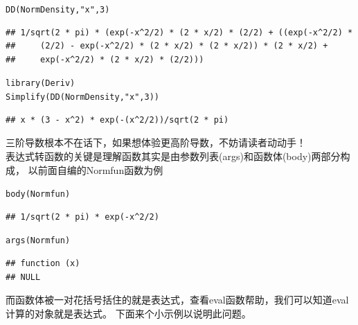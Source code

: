 \documentclass[a4paper]{ctexart}\usepackage[]{graphicx}\usepackage[]{color}
\makeatletter
\newcommand{\hlnum}[1]{\textcolor[rgb]{0.502,0.086,1}{#1}}%
\newcommand{\hlstr}[1]{\textcolor[rgb]{1,0.4,0.2}{#1}}%
\newcommand{\hlstd}[1]{\textcolor[rgb]{0.251,0.251,0.251}{#1}}%
\newcommand{\hlkwd}[1]{\textcolor[rgb]{0.69,0.188,0.941}{#1}}%
\newenvironment{kframe}{%
 \def\at@end@of@kframe{}%
 \ifinner\ifhmode%
  \def\at@end@of@kframe{\end{minipage}}%
  \begin{minipage}{\columnwidth}%
 \fi\fi%
 \def\FrameCommand##1{\hskip\@totalleftmargin \hskip-\fboxsep
 \colorbox{shadecolor}{##1}\hskip-\fboxsep
     \hskip-\linewidth \hskip-\@totalleftmargin \hskip\columnwidth}%
 \MakeFramed {\advance\hsize-\width
   \@totalleftmargin\z@ \linewidth\hsize
   \@setminipage}}%
 {\par\unskip\endMakeFramed%
 \at@end@of@kframe}
\newenvironment{knitrout}{}{} %
\makeatother
\begin{document}
\begin{knitrout}
\color{fgcolor}\begin{kframe}
\begin{alltt}
\hlkwd{DD}\hlstd{(NormDensity,} \hlstr{"x"}\hlstd{,} \hlnum{3}\hlstd{)}
\end{alltt}
\begin{verbatim}
## 1/sqrt(2 * pi) * (exp(-x^2/2) * (2 * x/2) * (2/2) + ((exp(-x^2/2) * 
##     (2/2) - exp(-x^2/2) * (2 * x/2) * (2 * x/2)) * (2 * x/2) + 
##     exp(-x^2/2) * (2 * x/2) * (2/2)))
\end{verbatim}
\begin{alltt}
\hlkwd{library}\hlstd{(Deriv)}
\hlkwd{Simplify}\hlstd{(}\hlkwd{DD}\hlstd{(NormDensity,} \hlstr{"x"}\hlstd{,} \hlnum{3}\hlstd{))}
\end{alltt}
\begin{verbatim}
## x * (3 - x^2) * exp(-(x^2/2))/sqrt(2 * pi)
\end{verbatim}
\end{kframe}
\end{knitrout}
三阶导数根本不在话下，如果想体验更高阶导数，不妨请读者动动手！\\
表达式转函数的关键是理解函数其实是由参数列表(args)和函数体(body)两部分构成，
以前面自编的Normfun函数为例
\begin{knitrout}
\color{fgcolor}\begin{kframe}
\begin{alltt}
\hlkwd{body}\hlstd{(Normfun)}
\end{alltt}
\begin{verbatim}
## 1/sqrt(2 * pi) * exp(-x^2/2)
\end{verbatim}
\begin{alltt}
\hlkwd{args}\hlstd{(Normfun)}
\end{alltt}
\begin{verbatim}
## function (x) 
## NULL
\end{verbatim}
\end{kframe}
\end{knitrout}
而函数体被一对花括号括住的就是表达式，查看eval函数帮助，我们可以知道eval计算的对象就是表达式。
下面来个小示例以说明此问题。
\end{document}
